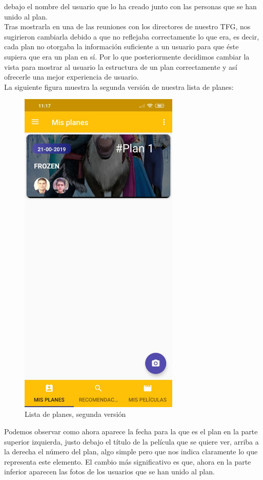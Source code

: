 debajo el nombre del usuario que lo ha creado junto con las personas que se han unido al plan.
\\
Tras mostrarla en una de las reuniones con los directores de nuestro TFG, nos sugirieron cambiarla debido a que no reflejaba correctamente lo que era, es decir, 
cada plan no otorgaba la información suficiente a un usuario para que éste supiera que era un plan en sí. Por lo que posteriormente decidimos cambiar la vista
para mostrar al usuario la estructura de un plan correctamente y así ofrecerle una mejor experiencia de usuario. 
\\
La siguiente figura muestra la segunda versión de nuestra lista de planes: 
\begin{figure}[H]
    \centering
    \includegraphics[width=3in]{figures/planslist2.jpg}
    \caption{Lista de planes, segunda versión}
\end{figure}
Podemos observar como ahora aparece la fecha para la que es el plan en la parte superior izquierda, justo debajo el título de la película que se quiere ver, arriba a la derecha el número del plan, algo simple pero que nos indica
claramente lo que representa este elemento.
El cambio más significativo es que, ahora en la parte inferior aparecen las fotos de los usuarios que se han unido al plan.

